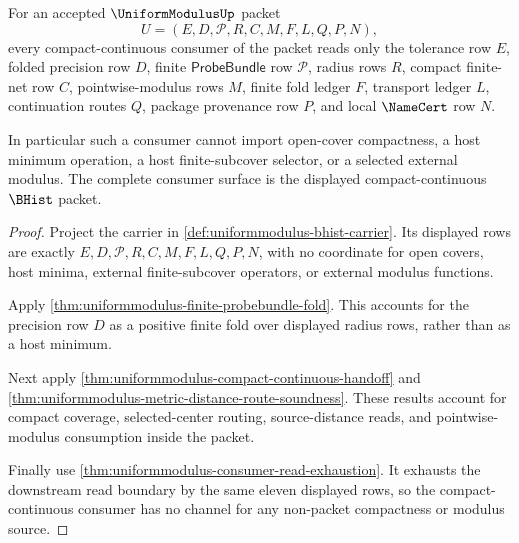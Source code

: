 \begin{theorem}
\label{thm:uniformmodulus-compact-continuous-consumer-exhaustion}
For an accepted $\UniformModulusUp$ packet
$$
U=(E,D,\mathcal{P},R,C,M,F,L,Q,P,N),
$$
every compact-continuous consumer of the packet reads only the tolerance row $E$, folded precision row $D$, finite $\mathsf{ProbeBundle}$ row $\mathcal{P}$, radius rows $R$, compact finite-net row $C$, pointwise-modulus rows $M$, finite fold ledger $F$, transport ledger $L$, continuation routes $Q$, package provenance row $P$, and local $\NameCert$ row $N$.

In particular such a consumer cannot import open-cover compactness, a host minimum operation, a host finite-subcover selector, or a selected external modulus. The complete consumer surface is the displayed compact-continuous $\BHist$ packet.
\end{theorem}
\begin{proof}
Project the carrier in \autoref{def:uniformmodulus-bhist-carrier}. Its displayed rows are exactly $E,D,\mathcal{P},R,C,M,F,L,Q,P,N$, with no coordinate for open covers, host minima, external finite-subcover operators, or external modulus functions.

Apply \autoref{thm:uniformmodulus-finite-probebundle-fold}. This accounts for the precision row $D$ as a positive finite fold over displayed radius rows, rather than as a host minimum.

Next apply \autoref{thm:uniformmodulus-compact-continuous-handoff} and \autoref{thm:uniformmodulus-metric-distance-route-soundness}. These results account for compact coverage, selected-center routing, source-distance reads, and pointwise-modulus consumption inside the packet.

Finally use \autoref{thm:uniformmodulus-consumer-read-exhaustion}. It exhausts the downstream read boundary by the same eleven displayed rows, so the compact-continuous consumer has no channel for any non-packet compactness or modulus source.
\end{proof}

